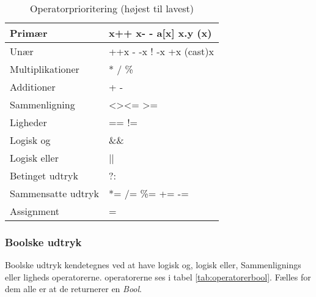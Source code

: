 \begin{table}[H]
    \centering
    \begin{tabular}{|l|l|}
        \hline
        \centering

        Primær             & x++ \quad x- - \quad a{[}x{]} \quad x.y \quad (x)                 \\ \hline
        Unær               & ++x \quad - -x \quad ! \quad -x \quad +x \quad (cast)x       \\ \hline
        Multiplikationer   & * \quad / \quad \%                                               \\ \hline
        Additioner         & + \quad -                                                        \\ \hline
        Sammenligning      & \textless \quad \textgreater \quad \textless= \quad\textgreater= \\ \hline
        Ligheder           & == \quad !=                                                      \\ \hline
        Logisk og          & \&\&                                                              \\ \hline
        Logisk eller       & ||                                                               \\ \hline
        Betinget udtryk    & ?:                                                               \\ \hline
        Sammensatte udtryk & *= \quad /= \quad \%= \quad += \quad -=                          \\ \hline
        Assignment         & =                                                                \\ \hline

    \end{tabular}
    \caption{Operatorprioritering (højest til lavest)}
    \label{tab:operatorprioritering}
\end{table}


\subsubsection{Boolske udtryk}
Boolske udtryk kendetegnes ved at have logisk og, logisk eller, Sammenlignings eller ligheds operatorerne. operatorerne ses i tabel \ref{tab:operatorerbool}. Fælles for dem alle er at de returnerer en \textit{Bool}.

